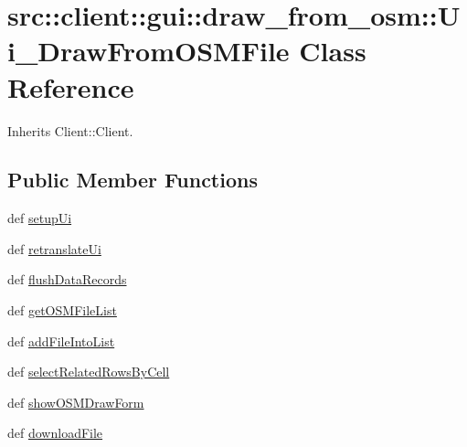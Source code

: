 \hypertarget{classsrc_1_1client_1_1gui_1_1draw__from__osm_1_1Ui__DrawFromOSMFile}{
\section{src::client::gui::draw\_\-from\_\-osm::Ui\_\-DrawFromOSMFile Class Reference}
\label{classsrc_1_1client_1_1gui_1_1draw__from__osm_1_1Ui__DrawFromOSMFile}
}


Inherits Client::Client.

\subsection*{Public Member Functions}
\begin{DoxyCompactItemize}
\item 
def \hyperlink{classsrc_1_1client_1_1gui_1_1draw__from__osm_1_1Ui__DrawFromOSMFile_a7af7cb45df7e06eeef1c155e49a2aafb}{setupUi}
\item 
def \hyperlink{classsrc_1_1client_1_1gui_1_1draw__from__osm_1_1Ui__DrawFromOSMFile_ae32c9120419c1f0528a468a30ec3fd52}{retranslateUi}
\item 
def \hyperlink{classsrc_1_1client_1_1gui_1_1draw__from__osm_1_1Ui__DrawFromOSMFile_add4b2bf9525274304427977b36b65653}{flushDataRecords}
\item 
def \hyperlink{classsrc_1_1client_1_1gui_1_1draw__from__osm_1_1Ui__DrawFromOSMFile_ad087632c20f85122a9e6698ae5c3378d}{getOSMFileList}
\item 
def \hyperlink{classsrc_1_1client_1_1gui_1_1draw__from__osm_1_1Ui__DrawFromOSMFile_a0434fc2055d2bec83acccb6ed890594e}{addFileIntoList}
\item 
def \hyperlink{classsrc_1_1client_1_1gui_1_1draw__from__osm_1_1Ui__DrawFromOSMFile_a9c4d0284aa451139fc08280cc4381d7f}{selectRelatedRowsByCell}
\item 
def \hyperlink{classsrc_1_1client_1_1gui_1_1draw__from__osm_1_1Ui__DrawFromOSMFile_a69047d7b22ed10011b036e47859088a2}{showOSMDrawForm}
\item 
def \hyperlink{classsrc_1_1client_1_1gui_1_1draw__from__osm_1_1Ui__DrawFromOSMFile_a6975a594bec41cbd81f5000b4f502897}{downloadFile}
\end{DoxyCompactItemize}
